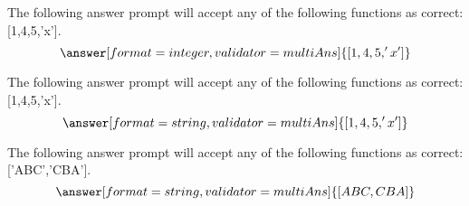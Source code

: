 \documentclass{ximera}
\begin{document}
    \begin{problem}
        The following answer prompt will accept any of the following functions as correct: [1,4,5,'x']. 
        \[
            \answer[format=integer,validator=multiAns]{[1,4,5,'x']}
        \]
    \end{problem}

    \begin{problem}
        The following answer prompt will accept any of the following functions as correct: [1,4,5,'x']. 
        \[
            \answer[format=string,validator=multiAns]{[1,4,5,'x']}
        \]
    \end{problem}

    \begin{problem}
        The following answer prompt will accept any of the following functions as correct: ['ABC','CBA']. 
        \[
            \answer[format=string,validator=multiAns]{[ABC,CBA]}
        \]
    \end{problem}
\end{document}
